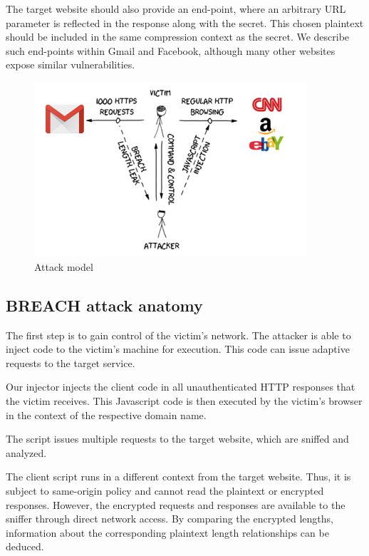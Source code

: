 \documentclass[a4paper, 11 pt, conference]{article}  %
\begin{document}
The target website should also provide an end-point, where an arbitrary URL
parameter is reflected in the response along with the secret. This chosen
plaintext should be included in the same compression context as the secret. We
describe such end-points within Gmail and Facebook, although many other websites
expose similar vulnerabilities.

   \begin{figure}[thpb]
      \centering
      \includegraphics[width=0.9\textwidth]{figures/attack_model.png}
      \caption{Attack model}
   \end{figure}

\subsection{BREACH attack anatomy}

The first step is to gain control of the victim's network.
The attacker is able to inject code to the
victim's machine for execution. This code can issue adaptive requests to
the target service.

Our injector injects the client code in all unauthenticated HTTP responses that
the victim receives. This Javascript code is then executed by the victim's
browser in the context of the respective domain name.

The script issues multiple requests to the target website, which are sniffed and analyzed.

The client script runs in a different context from the
target website. Thus, it is subject to same-origin policy \cite{c8} and cannot read the
plaintext or encrypted responses. However, the encrypted requests and responses
are available to the sniffer through direct network access. By comparing the
encrypted lengths, information about the corresponding
plaintext length relationships can be deduced.
\end{document}
